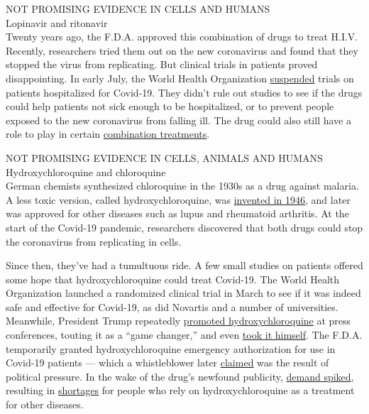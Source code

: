 NOT PROMISING EVIDENCE IN CELLS AND HUMANS\\
Lopinavir and ritonavir\\
Twenty years ago, the F.D.A. approved this combination of drugs to treat
H.I.V. Recently, researchers tried them out on the new coronavirus and
found that they stopped the virus from replicating. But clinical trials
in patients proved disappointing. In early July, the World Health
Organization
\href{https://www.who.int/news-room/detail/04-07-2020-who-discontinues-hydroxychloroquine-and-lopinavir-ritonavir-treatment-arms-for-covid-19}{suspended}
trials on patients hospitalized for Covid-19. They didn't rule out
studies to see if the drugs could help patients not sick enough to be
hospitalized, or to prevent people exposed to the new coronavirus from
falling ill. The drug could also still have a role to play in certain
\href{https://www.thelancet.com/journals/lancet/article/PIIS0140-6736(20)31042-4/fulltext}{combination
treatments}.

NOT PROMISING EVIDENCE IN CELLS, ANIMALS AND HUMANS\\
Hydroxychloroquine and chloroquine\\
German chemists synthesized chloroquine in the 1930s as a drug against
malaria. A less toxic version, called hydroxychloroquine, was
\href{https://www.nature.com/articles/s41421-020-0156-0\#:~:text=Hydroxychloroquine\%20(HCQ)\%20sulfate\%2C\%20a,than\%20CQ\%20in\%20animals4.}{invented
in 1946}, and later was approved for other diseases such as lupus and
rheumatoid arthritis. At the start of the Covid-19 pandemic, researchers
discovered that both drugs could stop the coronavirus from replicating
in cells.

Since then, they've had a tumultuous ride. A few small studies on
patients offered some hope that hydroxychloroquine could treat Covid-19.
The World Health Organization launched a randomized clinical trial in
March to see if it was indeed safe and effective for Covid-19, as did
Novartis and a number of universities. Meanwhile, President Trump
repeatedly
\href{https://www.nytimes3xbfgragh.onion/2020/04/06/us/politics/coronavirus-trump-malaria-drug.html}{promoted
hydroxychloroquine} at press conferences, touting it as a ``game
changer,'' and even
\href{https://www.nytimes3xbfgragh.onion/2020/05/18/us/politics/trump-hydroxychloroquine-covid-coronavirus.html}{took
it himself}. The F.D.A. temporarily granted hydroxychloroquine emergency
authorization for use in Covid-19 patients --- which a whistleblower
later
\href{https://www.buzzfeednews.com/article/zahrahirji/fda-eua-hydroxychloroquine-chloroquine}{claimed}
was the result of political pressure. In the wake of the drug's newfound
publicity,
\href{https://www.nytimes3xbfgragh.onion/2020/04/25/us/coronavirus-trump-chloroquine-hydroxychloroquine.html}{demand
spiked}, resulting in
\href{https://ard.bmj.com/content/early/2020/07/01/annrheumdis-2020-218164}{shortages}
for people who rely on hydroxychloroquine as a treatment for other
diseases.

